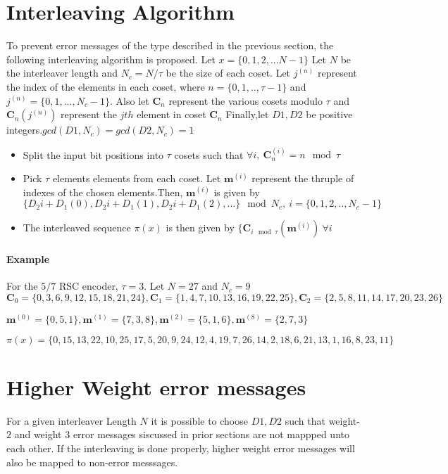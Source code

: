 \documentclass[11pt, oneside, dvipdfmx]{book}
\begin{document}
 
 
 
 
 \section{Interleaving Algorithm}
 To prevent error messages of the type described in the previous section, the following interleaving algorithm is proposed.
 Let $x=\{0,1,2,...N-1\}$
 Let $N$ be the interleaver length and $N_c=N/\tau$ be the size of each coset. Let $j^{(n)}$ represent the index of the elements in each coset, where $n=\{0,1,..,\tau-1\}$ and $j^{(n)}=\{0,1,...,N_c-1\}$. Also let $\mathbf{C}_n$ represent the various cosets modulo $\tau$ and $\mathbf{C}_n(j^{(n)})$ represent the $jth$ element in coset $\mathbf{C}_n$
 Finally,let $D1,D2$ be positive integers.$gcd(D1,N_c)=gcd(D2,N_c)=1$
 
 \begin{itemize}
 \item Split the input bit positions into $\tau$ cosets such that
 $\forall i,~ \mathbf{C}_n^{(i)}= n \mod \tau$
 
 \item Pick $\tau$ elements elements from each coset. Let $\mathbf{m}^{(i)}$ represent the thruple of indexes of the  chosen elements.Then, $\mathbf{m}^{(i)}$ is given by $\{D_2i+D_1(0),D_2i+D_1(1),D_2i+D_1(2),...\} \mod N_c,~i =\{0,1,2,..,N_c-1\}$
 
 \item The interleaved sequence $\pi(x)$  is then given by $\{\mathbf{C}_{i \mod \tau}(\mathbf{m}^{(i)})~ \forall i$
 \end{itemize}
 
 \paragraph{Example}
 For the $5/7$ RSC encoder, $\tau=3$.
 Let $N=27$ and $N_c=9$ $\mathbf{C}_0=\{0,3,6,9,12,15,18,21,24\},\mathbf{C}_1=\{1,4,7,10,13,16,19,22,25\},\mathbf{C}_2=\{2,5,8,11,14,17,20,23,26\}$
 
$\mathbf{m}^{(0)}=\{0,5,1\},\mathbf{m}^{(1)}=\{7,3,8\},\mathbf{m}^{(2)}=\{5,1,6\},\mathbf{m}^{(8)}=\{2,7,3\}$

$\pi(x)=\{0,15,13,22,10,25,17,5,20,9,24,12,4,19,7,26,14,2,18,6,21,13,1,16,8,23,11\}$

 
 \section{Higher Weight error messages}
 For a given interleaver Length $N$ it is possible to choose $D1,D2$ such that weight-$2$ and weight $3$ error messages siscussed in prior sections are not mappped unto each other. If the interleaving is done properly, higher weight error messages will also be mapped to non-error  messsages.
 
\end{document}
